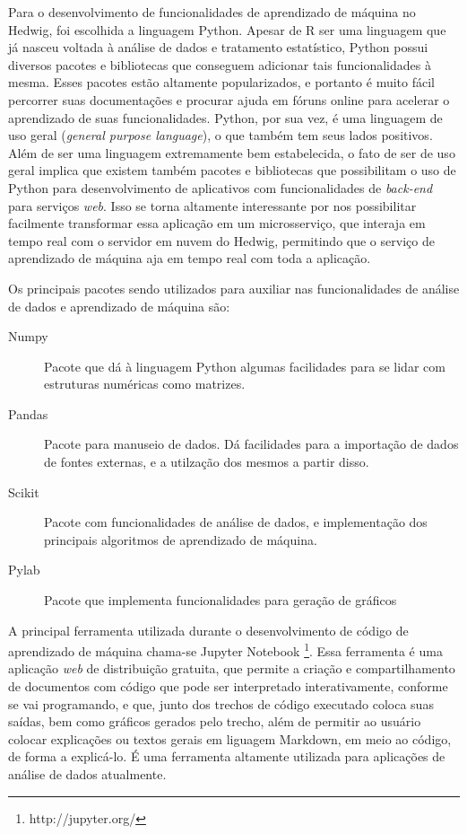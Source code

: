 			Para o desenvolvimento de funcionalidades de aprendizado de máquina no Hedwig, foi escolhida a linguagem Python. Apesar de R ser uma linguagem que já nasceu voltada à análise de dados e tratamento estatístico, Python possui diversos pacotes e bibliotecas que conseguem adicionar tais funcionalidades à mesma. Esses pacotes estão altamente popularizados, e portanto é muito fácil percorrer suas documentações e procurar ajuda em fóruns online para acelerar o aprendizado de suas funcionalidades. Python, por sua vez, é uma linguagem de uso geral (\emph{general purpose language}), o que também tem seus lados positivos. Além de ser uma linguagem extremamente bem estabelecida, o fato de ser de uso geral implica que existem também pacotes e bibliotecas que possibilitam o uso de Python para desenvolvimento de aplicativos com funcionalidades de \emph{back-end} para serviços \emph{web}. Isso se torna altamente interessante por nos possibilitar facilmente transformar essa aplicação em um microsserviço, que interaja em tempo real com o servidor em nuvem do Hedwig, permitindo que o serviço de aprendizado de máquina aja em tempo real com toda a aplicação.

			Os principais pacotes sendo utilizados para auxiliar nas funcionalidades de análise de dados e aprendizado de máquina são:

			\begin{description}
				\item [Numpy] Pacote que dá à linguagem Python algumas facilidades para se lidar com estruturas numéricas como matrizes.
				\item [Pandas] Pacote para manuseio de dados. Dá facilidades para a importação de dados de fontes externas, e a utilzação dos mesmos a partir disso.
				\item [Scikit] Pacote com funcionalidades de análise de dados, e implementação dos principais algoritmos de aprendizado de máquina.
				\item [Pylab] Pacote que implementa funcionalidades para geração de gráficos
			\end{description}

			A principal ferramenta utilizada durante o desenvolvimento de código de aprendizado de máquina chama-se Jupyter Notebook \footnote{http://jupyter.org/}. Essa ferramenta é uma aplicação \emph{web} de distribuição gratuita, que permite a criação e compartilhamento de documentos com código que pode ser interpretado interativamente, conforme se vai programando, e que, junto dos trechos de código executado coloca suas saídas, bem como gráficos gerados pelo trecho, além de permitir ao usuário colocar explicações ou textos gerais em liguagem Markdown, em meio ao código, de forma a explicá-lo. É uma ferramenta altamente utilizada para aplicações de análise de dados atualmente.

